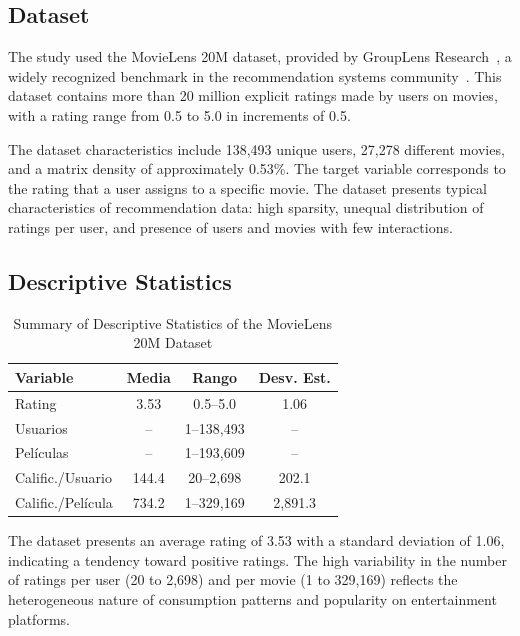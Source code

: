 \documentclass[conference]{IEEEtran}
\begin{document}
\subsection{Dataset}

The study used the MovieLens 20M dataset, provided by GroupLens Research~\cite{harper2015movielens}, a widely recognized benchmark in the recommendation systems community~\cite{grouplens2023movielens}. This dataset contains more than 20 million explicit ratings made by users on movies, with a rating range from 0.5 to 5.0 in increments of 0.5.

The dataset characteristics include 138,493 unique users, 27,278 different movies, and a matrix density of approximately 0.53\%. The target variable corresponds to the rating that a user assigns to a specific movie. The dataset presents typical characteristics of recommendation data: high sparsity, unequal distribution of ratings per user, and presence of users and movies with few interactions.

\subsection{Descriptive Statistics}

\begin{table}[htbp]
\caption{Summary of Descriptive Statistics of the MovieLens 20M Dataset}
\centering
\small
\begin{tabular}{lccc}
\hline
\textbf{Variable} & \textbf{Media} & \textbf{Rango} & \textbf{Desv. Est.} \\
\hline
Rating         & 3.53  & 0.5--5.0     & 1.06 \\
Usuarios       & --    & 1--138,493   & --   \\
Películas      & --    & 1--193,609   & --   \\
Calific./Usuario & 144.4 & 20--2,698   & 202.1 \\
Calific./Película & 734.2 & 1--329,169 & 2,891.3 \\
\hline
\end{tabular}
\label{tab:descriptivos}
\end{table}

The dataset presents an average rating of 3.53 with a standard deviation of 1.06, indicating a tendency toward positive ratings. The high variability in the number of ratings per user (20 to 2,698) and per movie (1 to 329,169) reflects the heterogeneous nature of consumption patterns and popularity on entertainment platforms.
\end{document}
